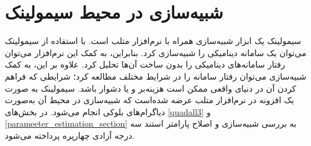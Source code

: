 \chapter{شبیه‌سازی  در محیط سیمولینک}
سیمولینک یک ابزار شبیه‌سازی همراه با نرم‌افزار متلب است.
با استفاده از سیمولینک می‌توان یک سامانه دینامیکی را شبیه‌سازی کرد. بنابراین، به کمک این نرم‌افزار می‌توان رفتار سامانه‌های دینامیکی را بدون ساخت آن‌ها تحلیل کرد. علاوه بر این، به کمک شبیه‌سازی می‌توان رفتار سامانه را در شرایط مختلف مطالعه کرد؛ شرایطی که فراهم کردن آن در دنیای واقعی ممکن است هزینه‌بر و  یا دشوار باشد. سیمولینک به صورت یک افزونه در نرم‌افزار متلب عرضه شده‌است که شبیه‌سازی در محیط آن به‌صورت دیاگرام‌های بلوکی انجام می‌شود. در بخش‌های
\ref{quadall3}
و
\ref{parameeter_estimation_section}
به بررسی شبیه‌سازی و اصلاح پارامتر استند سه درجه آزادی چهارپره پرداخته می‌شود.